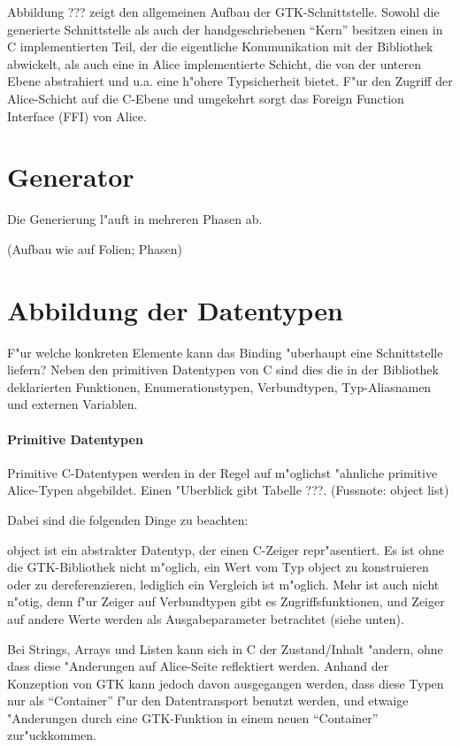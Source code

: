 \documentclass{article}
\begin{document}
Abbildung ??? zeigt den allgemeinen Aufbau der GTK-Schnittstelle.
Sowohl die generierte Schnittstelle als auch der handgeschriebenen ``Kern''
besitzen einen in C implementierten Teil, der die eigentliche Kommunikation
mit der Bibliothek abwickelt, als auch eine in Alice implementierte
Schicht, die von der unteren Ebene abstrahiert und u.a. eine h"ohere
Typsicherheit bietet. F"ur den Zugriff der Alice-Schicht auf die C-Ebene
und umgekehrt sorgt das Foreign Function Interface (FFI) von Alice.

\section{Generator}

Die Generierung l"auft in mehreren Phasen ab.

(Aufbau wie auf Folien; Phasen)

\section{Abbildung der Datentypen}

F"ur welche konkreten Elemente kann das Binding "uberhaupt eine Schnittstelle
liefern? Neben den primitiven Datentypen von C sind dies die in der Bibliothek
deklarierten Funktionen, Enumerationstypen, Verbundtypen, Typ-Aliasnamen
und externen Variablen.

\paragraph{Primitive Datentypen}

Primitive C-Datentypen werden in der Regel auf m"oglichst
"ahnliche primitive Alice-Typen abgebildet. Einen "Uberblick gibt Tabelle ???.
(Fussnote: object list)

Dabei sind die folgenden Dinge zu beachten:

object ist ein abstrakter Datentyp, der einen C-Zeiger repr"asentiert.
Es ist ohne die GTK-Bibliothek nicht m"oglich, ein Wert vom Typ object zu
konstruieren oder zu dereferenzieren, lediglich ein Vergleich ist m"oglich.
Mehr ist auch nicht n"otig, denn f"ur Zeiger auf Verbundtypen gibt es
Zugriffsfunktionen, und Zeiger auf andere Werte werden als Ausgabeparameter
betrachtet (siehe unten).

Bei Strings, Arrays und Listen kann sich in C der Zustand/Inhalt "andern,
ohne dass diese "Anderungen auf Alice-Seite reflektiert werden. Anhand der
Konzeption von GTK kann jedoch davon ausgegangen werden, dass diese Typen
nur als ``Container'' f"ur den Datentransport benutzt werden, und etwaige
"Anderungen durch eine GTK-Funktion in einem neuen ``Container'' zur"uckkommen.
\end{document}
